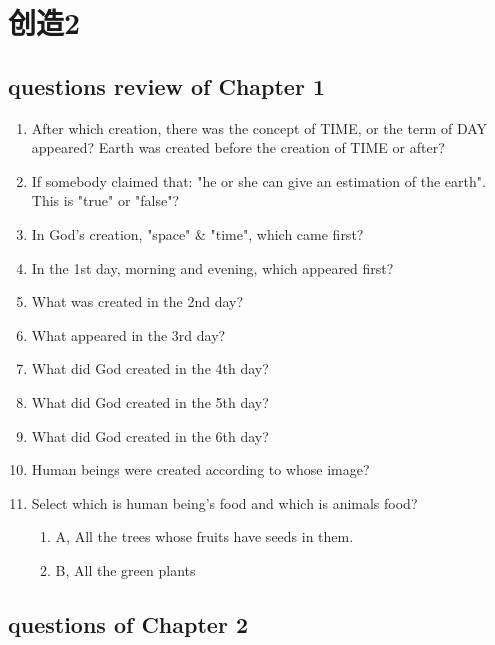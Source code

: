 

\chapter{创造2 }

\section{questions review of Chapter 1}
\begin{enumerate}[nosep]
\large
\item After which creation, there was the concept of TIME, or the term of DAY appeared? 
\itme Earth was created before the creation of TIME or after?
\item If somebody claimed that: "he or she can give an estimation of the earth". This is "true" or "false"?
\item In God's creation, "space" & "time", which came first?
\item In the 1st day, morning and evening, which appeared first?
\item What was created in the 2nd day?
\item What appeared in the 3rd day?
\item What did God created in the 4th day?
\item What did God created in the 5th day?
\item What did God created in the 6th day?
\item Human beings were created according to whose image?
\item Select which is human being’s food and which is animals food?
\begin{enumerate}[nosep]
\item A, All the trees whose fruits have seeds in them. 
\item B, All the green plants
\end{enumerate}
\end{enumerate}

\section{questions of Chapter 2}

